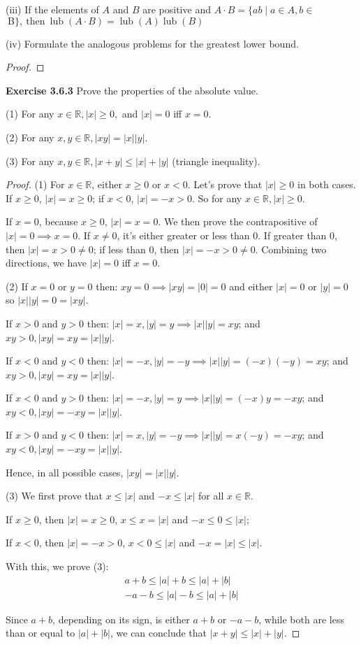 \documentclass[12pt]{article}
\newcommand{\bbR}{\mathbb{R}}
\theoremstyle{definition}
\numberwithin{equation}{subsection}
\begin{document}
(iii) If the elements of $A$ and $B$ are positive and $A \cdot B=\{a b \mid a \in A, b \in$
$\mathrm{~ B \} , ~ t h e n ~} \operatorname{lub}(A \cdot B)=\operatorname{lub}(A) \operatorname{lub}(B)$

(iv) Formulate the analogous problems for the greatest lower bound.
\begin{proof}

\end{proof}


\textbf{Exercise 3.6.3} Prove the properties of the absolute value.

(1) For any $x \in \mathbb{R},|x| \geq 0,$ and $|x|=0$ iff $x=0$.

(2) For any $x, y \in \mathbb{R},|x y|=|x||y|$.

(3) For any $x, y \in \mathbb{R},|x+y| \leq|x|+|y|$ (triangle inequality).


\begin{proof}
(1) For $x \in \bbR$, either $x \geq 0$ or $x < 0$. Let's prove that $|x| \geq 0$ in both cases. If $x \geq 0$, $|x| = x \geq 0$; if $x < 0$, $|x| = -x > 0$. So for any  $x \in \mathbb{R},|x| \geq 0$. 

If $x=0$, because $x\geq 0$, $|x|=x =0$. We then prove the contrapositive of $|x|=0\implies x=0$. If $x\neq 0$, it's either greater or less than 0. If greater than 0, then $|x|=x>0\neq 0$; if less than 0, then $|x|=-x>0\neq 0$. Combining two directions, we have $|x|=0$ iff $x=0$.

\bigskip
(2) 
If $x=0$ or $y=0$
then:
$
xy=0 \implies |xy|=|0|=0
$
and either $|x|=0$ or $|y|=0$ so 
$
|x||y|=0=|xy|
$.

If $x>0$ and $y>0$
then:
$|x| =x, |y| =y \implies |x||y| =x y $;
and 
$xy>0, |xy|=xy = |x||y|$.

If $x<0$ and $y<0$
then:
$|x| =-x, |y| =-y \implies |x||y| =(-x)(-y)=xy $;
and 
$xy>0, |xy|=xy = |x||y|$.

If $x<0$ and $y>0$
then:
$|x| =-x, |y| =y \implies |x||y| =(-x)y=-xy $;
and 
$xy<0, |xy|=-xy = |x||y|$.

If $x>0$ and $y<0$
then:
$|x| =x, |y| =-y \implies |x||y| =x(-y)=-xy $;
and 
$xy<0, |xy|=-xy = |x||y|$.

Hence, in all possible cases, $|xy|=|x||y|$.

\bigskip
(3) We first prove that $x\leq|x|$ and $-x\leq|x|$ for all $x\in \bbR$.

If $x\geq 0$, then $|x|=x\geq 0$, $x\leq x=|x|$ and $-x\leq 0 \leq|x|$;

If $x < 0$, then $|x|=-x > 0$, $x < 0 \leq|x|$ and $-x = |x| \leq|x|$.

With this, we prove (3):
$$
\begin{aligned} a+b \leq|a|+b \leq|a|+|b| \\-a-b \leq|a|-b \leq|a|+|b| \end{aligned}
$$

Since $a+b$, depending on its sign, is either $a+b$ or $-a-b$, while both are less than or equal to $|a|+|b|$, we can conclude that $|x+y| \leq|x|+|y|$.
\end{proof}
\end{document}
